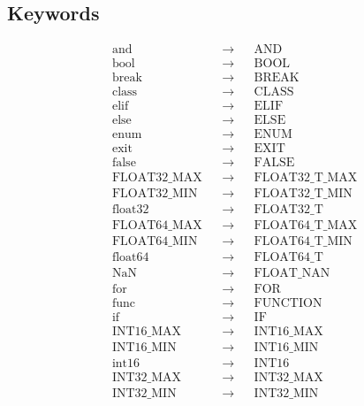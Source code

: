 \documentclass[]{article}
\begin{document}
\subsection{Keywords}
\begin{align}
    &\text{and}          &&\to &&\text{AND}             \\
    &\text{bool}         &&\to &&\text{BOOL}            \\
    &\text{break}        &&\to &&\text{BREAK}           \\
    &\text{class}        &&\to &&\text{CLASS}           \\
    &\text{elif}         &&\to &&\text{ELIF}            \\
    &\text{else}         &&\to &&\text{ELSE}            \\
    &\text{enum}         &&\to &&\text{ENUM}            \\
    &\text{exit}         &&\to &&\text{EXIT}            \\
    &\text{false}        &&\to &&\text{FALSE}           \\
    &\text{FLOAT32\_MAX} &&\to &&\text{FLOAT32\_T\_MAX} \\
    &\text{FLOAT32\_MIN} &&\to &&\text{FLOAT32\_T\_MIN} \\
    &\text{float32}      &&\to &&\text{FLOAT32\_T}      \\
    &\text{FLOAT64\_MAX} &&\to &&\text{FLOAT64\_T\_MAX} \\
    &\text{FLOAT64\_MIN} &&\to &&\text{FLOAT64\_T\_MIN} \\
    &\text{float64}      &&\to &&\text{FLOAT64\_T}      \\
    &\text{NaN}          &&\to &&\text{FLOAT\_NAN}      \\
    &\text{for}          &&\to &&\text{FOR}             \\
    &\text{func}         &&\to &&\text{FUNCTION}        \\
    &\text{if}           &&\to &&\text{IF}              \\
    &\text{INT16\_MAX}   &&\to &&\text{INT16\_MAX}      \\
    &\text{INT16\_MIN}   &&\to &&\text{INT16\_MIN}      \\
    &\text{int16}        &&\to &&\text{INT16}           \\
    &\text{INT32\_MAX}   &&\to &&\text{INT32\_MAX}      \\
    &\text{INT32\_MIN}   &&\to &&\text{INT32\_MIN}      \\

\end{align}
\end{document}
